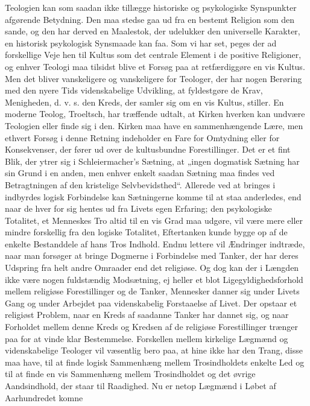 \documentclass[12pt,a4paper,openany]{book}
\newcommand{\opage}[1]{\marginnote{\footnotesize\textit{[#1]}}}
\begin{document}
Teologien kan som saadan ikke tillægge historiske og psykologiske
Synspunkter afgørende Betydning. Den maa stedse gaa ud fra en bestemt
Religion som den sande, og den har derved en Maalestok, der
udelukker den universelle Karakter, en historisk psykologisk Synsmaade
kan faa. Som vi har set, peges der ad forskellige Veje hen
til Kultus som det centrale Element i de positive Religioner, og enhver
Teologi maa tilsidst blive et Forsøg paa at retfærdiggøre en vis
Kultus. Men det bliver vanskeligere og vanskeligere for Teologer,
der har nogen Berøring med den nyere Tids videnskabelige Udvikling,
at fyldestgøre de Krav, Menigheden, d. v. s. den Kreds, der
samler sig om en vis Kultus, stiller. En moderne Teolog, Troeltsch,
har træffende udtalt, at Kirken hverken kan undvære Teologien
eller finde sig i den. Kirken maa have en sammenhængende Lære,
men ethvert Forsøg i denne Retning indeholder en Fare for Omtydning
eller for Konsekvenser, der fører ud over de kultusbundne Forestillinger.
Det er et fint Blik, der ytrer sig i Schleiermacher’s Sætning,
at „ingen dogmatisk Sætning har sin Grund i en anden, men
\opage{136}enhver enkelt saadan Sætning maa findes ved Betragtningen af den
kristelige Selvbevidsthed“. Allerede ved at bringes i indbyrdes logisk
Forbindelse kan Sætningerne komme til at staa anderledes, end naar
de hver for sig hentes ud fra Livets egen Erfaring; den psykologiske
Totalitet, et Menneskes Tro altid til en vis Grad maa udgøre, vil
være mere eller mindre forskellig fra den logiske Totalitet, Eftertanken
kunde bygge op af de enkelte Bestanddele af hans Tros Indhold.
Endnu lettere vil Ændringer indtræde, naar man forsøger at
bringe Dogmerne i Forbindelse med Tanker, der har deres Udspring
fra helt andre Omraader end det religiøse. Og dog kan der i Længden
ikke være nogen fuldstændig Modsætning, ej heller et blot Ligegyldighedsforhold
mellem religiøse Forestillinger og de Tanker, Mennesker
danner sig under Livets Gang og under Arbejdet paa videnskabelig
Forstaaelse af Livet. Der opstaar et religiøst Problem, naar
en Kreds af saadanne Tanker har dannet sig, og naar Forholdet mellem
denne Kreds og Kredsen af de religiøse Forestillinger trænger
paa for at vinde klar Bestemmelse. Forskellen mellem kirkelige
Lægmænd og videnskabelige Teologer vil væsentlig bero paa, at hine
ikke har den Trang, disse maa have, til at finde logisk Sammenhæng
mellem Trosindholdets enkelte Led og til at finde en vis Sammenhæng
mellem Trosindholdet og det øvrige Aandsindhold, der staar
til Raadighed. Nu er netop Lægmænd i Løbet af Aarhundredet komne
\end{document}
